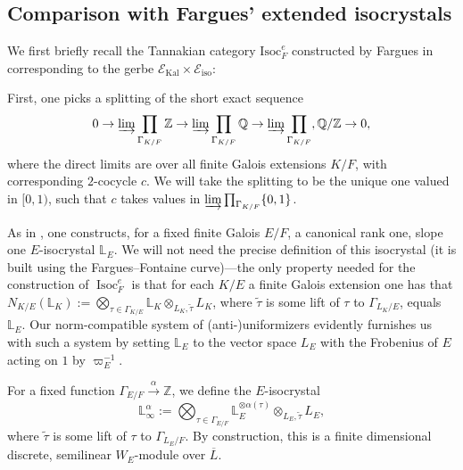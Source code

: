 \documentclass[11pt]{amsart}
\theoremstyle{definition}
\newcommand{\mc}{\mathcal}
\newcommand{\Q}{\mathbb{Q}}
\newcommand{\ov}{\overline}
\DeclareMathOperator{\Isoc}{Isoc}
\begin{document}
\subsection{Comparison with Fargues' extended isocrystals} 
We first briefly recall the Tannakian category $\text{Isoc}_{F}^{e}$ constructed by Fargues in \cite[\S 6]{Fargues} corresponding to the gerbe $\mc{E}_{\text{Kal}} \times \mc{E}_{\text{iso}}$:

First, one picks a splitting of the short exact sequence
\begin{equation*}
0 \to \varinjlim \prod_{\Gamma_{K/F}} \mathbb{Z} \to \varinjlim \prod_{\Gamma_{K/F}} \Q \to \varinjlim \prod_{\Gamma_{K/F}}, \mathbb{Q}/\mathbb{Z} \to 0,
\end{equation*}
where the direct limits are over all finite Galois extensions $K/F$, with corresponding $2$-cocycle $c$. We will take the splitting to be the unique one valued in $[0,1)$, such that $c$ takes values in $\varinjlim \prod_{\Gamma_{K/F}}\{0,1\}$.

As in \cite[\S 6.2]{Fargues}, one constructs, for a fixed finite Galois $E/F$, a canonical rank one, slope one $E$-isocrystal $\mathbb{L}_{E}$. We will not need the precise definition of this isocrystal (it is built using the Fargues--Fontaine curve)---the only property needed for the construction of $\Isoc^{e}_{F}$ is that for each $K/E$ a finite Galois extension one has that $N_{K/E}(\mathbb{L}_{K}) := \bigotimes_{\tau \in \Gamma_{K/E}} \mathbb{L}_{K} \otimes_{L_{K}, \tilde{\tau}} L_{K}$, where $\tilde{\tau}$ is some lift of $\tau$ to $\Gamma_{L_{K}/E}$, equals $\mathbb{L}_{E}$. Our norm-compatible system of (anti-)uniformizers evidently furnishes us with such a system by setting $\mathbb{L}_{E}$ to the vector space $L_{E}$ with the Frobenius of $E$ acting on $1$ by $\varpi_{E}^{-1}$. 

For a fixed function $\Gamma_{E/F} \xrightarrow{\alpha} \mathbb{Z}$, we define the $E$-isocrystal
\begin{equation*}
\mathbb{L}_{\infty}^{\alpha} := \bigotimes_{\tau \in \Gamma_{E/F}} \mathbb{L}_{E}^{\otimes\alpha(\tau)} \otimes_{L_{E},\tilde{\tau}} L_{E},
\end{equation*}
where $\tilde{\tau}$ is some lift of $\tau$ to $\Gamma_{L_{E}/F}$. By construction, this is a finite dimensional discrete, semilinear $W_{E}$-module over $\ov{L}$.
\end{document}
